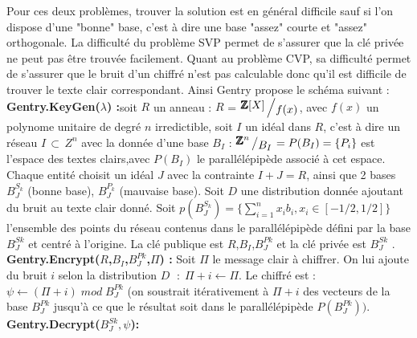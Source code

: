 \documentclass[a4paper,12pt]{article}
\begin{document}
Pour ces deux problèmes, trouver la solution est en général difficile sauf si l’on dispose d’une "bonne" base, c’est à dire une base "assez" courte et "assez" orthogonale. La difficulté du problème SVP permet de s’assurer que la clé privée ne peut pas être trouvée facilement. Quant au problème CVP, sa difficulté permet de s’assurer que le bruit d’un chiffré n’est pas calculable donc qu’il est difficile de trouver le texte clair correspondant.\newline
Ainsi Gentry propose le schéma suivant :\newline
\vspace{100\baselineskip}
\newcommand{\bigslant}[2]{{\raisebox{.2em}{$#1$}\left/\raisebox{-.2em}{$#2$}\right.}}
\newline
\textbf{Gentry.KeyGen($\lambda$) :}\newline soit $R$ un anneau : $R$ = $\bigslant{\pmb{\mathbb{Z}}[X]}{f(x)}$, avec $f(x)$ un polynome unitaire de degré $n$ irredictible, soit $I$ un idéal dans $R$, c'est à dire un réseau $I\,\subset\,Z^n$ avec la donnée d'une base $B_I$ : $\bigslant{\pmb{\mathbb{Z}}^n}{B_I} = P(B_I) =\{P_i\}$ est l’espace des textes clairs,avec $P(B_I)$ le parallélépipède associé à cet espace.
Chaque entité choisit un idéal $J$ avec la contrainte $I + J = R$, ainsi que 2 bases $B^{S_k}_J$ (bonne base), $B^{P_k}_J$ (mauvaise base).
Soit $D$ une distribution donnée ajoutant du bruit au texte clair donné.\newline
Soit $p(B^{S_k}_J) = \{\sum_{i=1}^{n}x_ib_i, x_i\in[-1/2, 1/2]\}$ l’ensemble des points du réseau contenus dans le parallélépipède défini par la base $B^{Sk}_J$ et centré à l’origine.\newline
La clé publique est $R$,$B_I$,$B^{Pk}_J$ et la clé privée est $B^{Sk}_J$ .\newline
\textbf{Gentry.Encrypt($R$,$B_I$,$B^{Pk}_J$,$\Pi$) :}\newline
Soit $\Pi$ le message clair à chiffrer.
On lui ajoute du bruit $i$ selon la distribution $D$ $\; : \; \Pi + i \leftarrow \Pi$.\newline
Le chiffré est : $\psi \leftarrow ( \Pi + i  )\; mod\; B^{Pk}_J$\newline
(on soustrait itérativement à $\Pi + i$  des vecteurs de la base $B^{Pk}_J$ jusqu’à ce que le résultat soit dans le parallélépipède $P(B^{Pk}_J))$.\newline
\textbf{Gentry.Decrypt($B^{Sk}_J,\psi$):}
     
\end{document}
